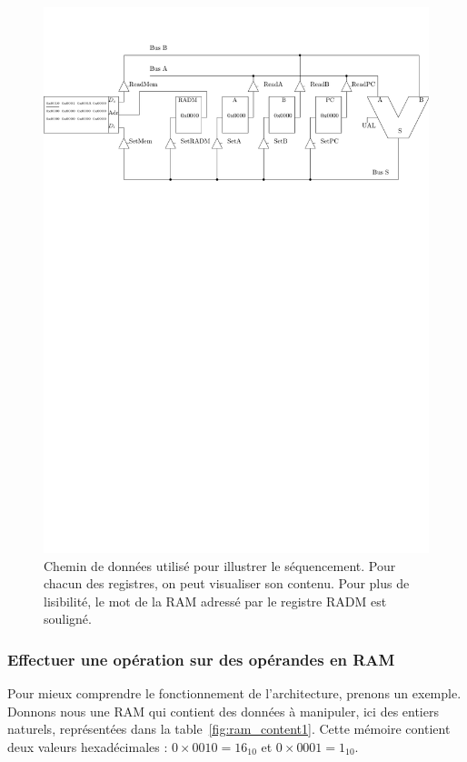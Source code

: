 \begin{figure}[htbp]
\includegraphics[width=\linewidth]{Figs/premier_chemin.pdf}
\caption{\label{fig:premier_chemin} Chemin de données utilisé pour illustrer le séquencement. Pour chacun des registres, on peut visualiser son contenu. Pour plus de lisibilité, le mot de la RAM adressé par le registre RADM est souligné.}
\end{figure}

\subsubsection{Effectuer une opération sur des opérandes en RAM}

Pour mieux comprendre le fonctionnement de l'architecture, prenons un exemple. Donnons nous une RAM qui contient des données à manipuler, ici des entiers naturels, représentées dans la table~\ref{fig:ram_content1}. Cette mémoire contient deux valeurs hexadécimales : $0\times0010 = 16_{10}$ et $0\times0001 = 1_{10}$.

